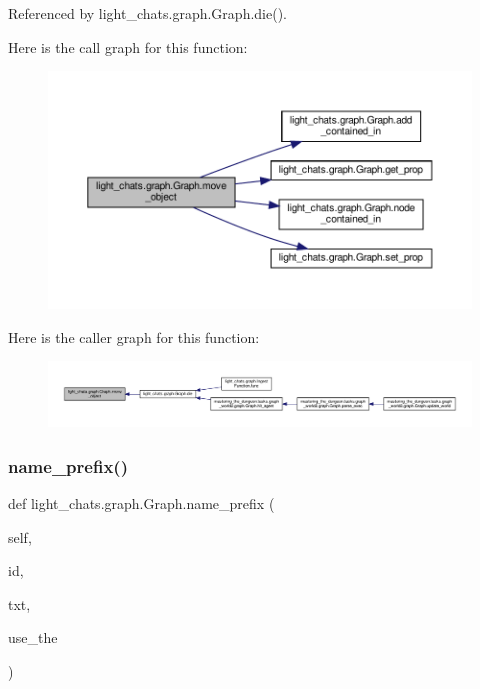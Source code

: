 Referenced by light\+\_\+chats.\+graph.\+Graph.\+die().

Here is the call graph for this function\+:
\nopagebreak
\begin{figure}[H]
\begin{center}
\leavevmode
\includegraphics[width=350pt]{classlight__chats_1_1graph_1_1Graph_a8a92252320777766ddab522549671f43_cgraph}
\end{center}
\end{figure}
Here is the caller graph for this function\+:
\nopagebreak
\begin{figure}[H]
\begin{center}
\leavevmode
\includegraphics[width=350pt]{classlight__chats_1_1graph_1_1Graph_a8a92252320777766ddab522549671f43_icgraph}
\end{center}
\end{figure}
\mbox{\label{classlight__chats_1_1graph_1_1Graph_a2da14e9a8a4c547fea59eee63dd9f70c}} 
\subsubsection{\texorpdfstring{name\+\_\+prefix()}{name\_prefix()}}
{\footnotesize\ttfamily def light\+\_\+chats.\+graph.\+Graph.\+name\+\_\+prefix (\begin{DoxyParamCaption}\item[{}]{self,  }\item[{}]{id,  }\item[{}]{txt,  }\item[{}]{use\+\_\+the }\end{DoxyParamCaption})}

